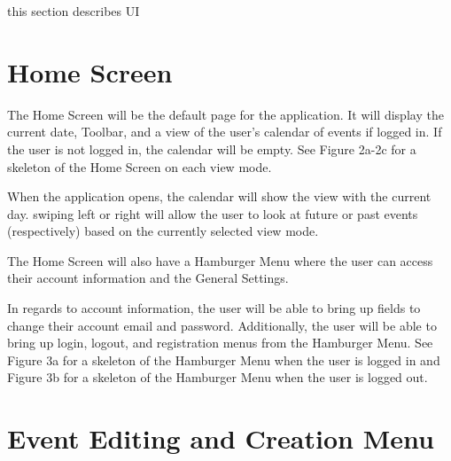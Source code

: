\documentclass{scrreprt}
\begin{document}
this section describes UI

\section{Home Screen}

The Home Screen will be the default page for the application.  It will display the current date, Toolbar, and a view of the user's calendar of events if logged in.  If the user is not logged in, the calendar will be empty. See Figure 2a-2c for a skeleton of the Home Screen on each view mode.

When the application opens, the calendar will show the view with the current day.  swiping left or right will allow the user to look at future or past events (respectively) based on the currently selected view mode.

The Home Screen will also have a Hamburger Menu where the user can access their account information and the General Settings.

In regards to account information, the user will be able to bring up fields to change their account email and password.  Additionally, the user will be able to bring up login, logout, and registration menus from the Hamburger Menu.  See Figure 3a for a skeleton of the Hamburger Menu when the user is logged in and Figure 3b for a skeleton of the Hamburger Menu when the user is logged out.

\section{Event Editing and Creation Menu}
\end{document}
